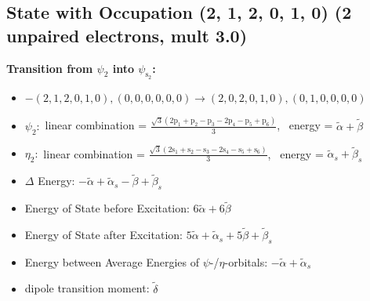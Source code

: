 \documentclass[12pt,a4paper]{article}
\begin{document}
\subsection*{State with Occupation (2, 1, 2, 0, 1, 0) (2 unpaired electrons, mult 3.0)}
        \noindent\textbf{Transition from $\psi_{2}$ into $\psi_{\text{s}_{2}}$:}
        \begin{itemize}
            \item $- (2, 1, 2, 0, 1, 0), (0, 0, 0, 0, 0, 0) \rightarrow (2, 0, 2, 0, 1, 0), (0, 1, 0, 0, 0, 0)$
        
            \item $\psi_{2}:$ linear combination = $\frac{\sqrt{3} \left(2 \text{p}_{1} + \text{p}_{2} - \text{p}_{3} - 2 \text{p}_{4} - \text{p}_{5} + \text{p}_{6}\right)}{3}$, \
            energy = $\tilde{\alpha} + \tilde{\beta}$
            
            \item $\eta_{2}:$ linear combination = $\frac{\sqrt{3} \left(2 \text{s}_{1} + \text{s}_{2} - \text{s}_{3} - 2 \text{s}_{4} - \text{s}_{5} + \text{s}_{6}\right)}{3}$, \
            energy = $\tilde{\alpha}_{s} + \tilde{\beta}_{s}$
            
                \item $\Delta$ Energy: $- \tilde{\alpha} + \tilde{\alpha}_{s} - \tilde{\beta} + \tilde{\beta}_{s}$
                \item Energy of State before Excitation: $6 \tilde{\alpha} + 6 \tilde{\beta}$
                \item Energy of State after Excitation: $5 \tilde{\alpha} + \tilde{\alpha}_{s} + 5 \tilde{\beta} + \tilde{\beta}_{s}$
                \item Energy between Average Energies of $\psi$-/$\eta$-orbitals: $- \tilde{\alpha} + \tilde{\alpha}_{s}$
            
            \item dipole transition moment: $\tilde{\delta}$
        
        \end{itemize}
        
\end{document}
